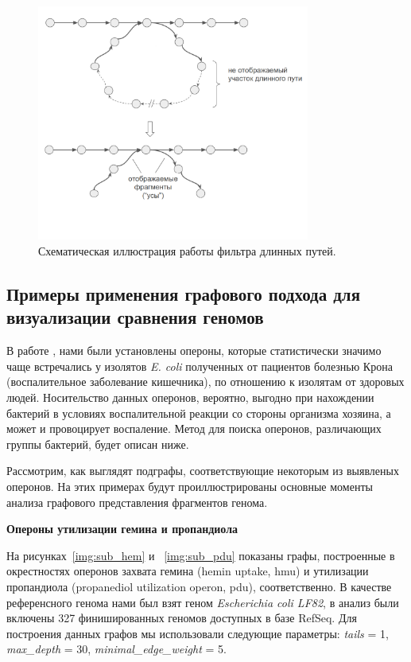 \begin{figure}[!ht] 
  \center
  \includegraphics[width=0.8\textwidth]{Dissertation/images/subgraphs/tails_schema_v2.png}
  \caption{Схематическая иллюстрация работы фильтра длинных путей. }
  \label{img:tails_schema} 
\end{figure}

\subsection*{Примеры применения графового подхода для визуализации сравнения геномов}

В работе \cite{rakitina2017genome}, нами были установлены опероны, которые статистически значимо чаще встречались у изолятов \textit{E. coli} полученных от пациентов болезнью Крона (воспалительное заболевание кишечника), по отношению к изолятам от здоровых людей. Носительство данных оперонов, вероятно, выгодно при нахождении бактерий в условиях воспалительной реакции со стороны организма хозяина, а может и провоцирует воспаление. Метод для поиска оперонов, различающих группы бактерий, будет описан ниже.

Рассмотрим, как выглядят подграфы, соответствующие некоторым из выявленых оперонов. На этих примерах будут проиллюстрированы основные моменты анализа графового представления фрагментов генома. 

\textbf{Опероны утилизации гемина и пропандиола}

На рисунках~\ref{img:sub_hem} и ~\ref{img:sub_pdu} показаны графы, построенные в окрестностях оперонов захвата гемина (hemin uptake, hmu) и утилизации пропандиола (propanediol utilization operon, pdu), соответственно. В качестве референсного генома нами был взят геном \textit{Escherichia coli LF82}, в анализ были включены 327 финишированных геномов доступных в базе RefSeq. Для построения данных графов мы использовали следующие параметры: \textit{tails} = 1, \textit{max\_depth} = 30, \textit{minimal\_edge\_weight} = 5. 

